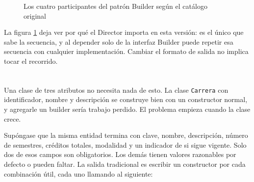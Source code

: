 \documentclass[10pt,a4paper]{article}
\begin{document}
\begin{figure}[H]
	\centering
	\caption{Los cuatro participantes del patrón Builder según el catálogo original}
	\label{img:estructura-gof}
\end{figure}

La figura \ref{img:estructura-gof} deja ver por qué el Director importa en esta versión: es el único que sabe la secuencia, y al depender solo de la interfaz Builder puede repetir esa secuencia con cualquier implementación. Cambiar el formato de salida no implica tocar el recorrido.

\section{\color{colorIPN}{Para qué sirve: el problema de los constructores telescópicos}}

Una clase de tres atributos no necesita nada de esto. La clase \texttt{Carrera} con identificador, nombre y descripción se construye bien con un constructor normal, y agregarle un builder sería trabajo perdido. El problema empieza cuando la clase crece.

Supóngase que la misma entidad termina con clave, nombre, descripción, número de semestres, créditos totales, modalidad y un indicador de si sigue vigente. Solo dos de esos campos son obligatorios. Los demás tienen valores razonables por defecto o pueden faltar. La salida tradicional es escribir un constructor por cada combinación útil, cada uno llamando al siguiente:
\end{document}

